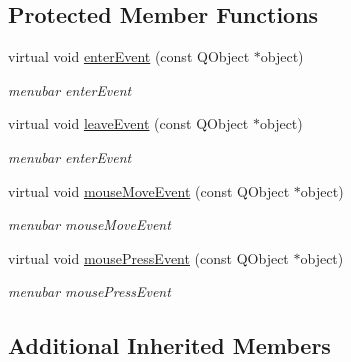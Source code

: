 \subsection*{Protected Member Functions}
\begin{DoxyCompactItemize}
\item 
\mbox{\label{class_menu_data_v1_abadde4f1e636452f3a94ad978162055e}} 
virtual void \hyperlink{class_menu_data_v1_abadde4f1e636452f3a94ad978162055e}{enter\+Event} (const Q\+Object $\ast$object)
\begin{DoxyCompactList}\small\item\em menubar enter\+Event \end{DoxyCompactList}\item 
\mbox{\label{class_menu_data_v1_ac506a2351f9d4cb7df6ef46344f8c952}} 
virtual void \hyperlink{class_menu_data_v1_ac506a2351f9d4cb7df6ef46344f8c952}{leave\+Event} (const Q\+Object $\ast$object)
\begin{DoxyCompactList}\small\item\em menubar enter\+Event \end{DoxyCompactList}\item 
\mbox{\label{class_menu_data_v1_a881849c55c03bd52908eb50cc41af7b6}} 
virtual void \hyperlink{class_menu_data_v1_a881849c55c03bd52908eb50cc41af7b6}{mouse\+Move\+Event} (const Q\+Object $\ast$object)
\begin{DoxyCompactList}\small\item\em menubar mouse\+Move\+Event \end{DoxyCompactList}\item 
\mbox{\label{class_menu_data_v1_ad1a25e54debbfa5bdb8d5f41b9775104}} 
virtual void \hyperlink{class_menu_data_v1_ad1a25e54debbfa5bdb8d5f41b9775104}{mouse\+Press\+Event} (const Q\+Object $\ast$object)
\begin{DoxyCompactList}\small\item\em menubar mouse\+Press\+Event \end{DoxyCompactList}\end{DoxyCompactItemize}
\subsection*{Additional Inherited Members}


